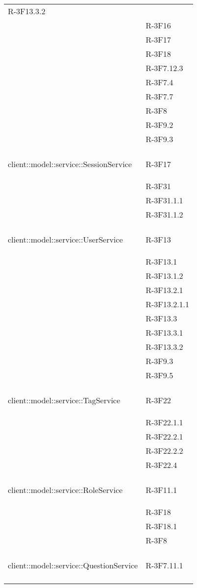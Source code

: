\begin{longtable}{l p{3cm}}
R-3F13.3.2 \tabularnewline &

R-3F16 \tabularnewline &

R-3F17 \tabularnewline &

R-3F18 \tabularnewline &

R-3F7.12.3 \tabularnewline &

R-3F7.4 \tabularnewline &

R-3F7.7 \tabularnewline &

R-3F8 \tabularnewline &

R-3F9.2 \tabularnewline &

R-3F9.3 \tabularnewline &\tabularnewline
\midrule
\hypertarget{client::model::service::SessionService}{client::model::service::SessionService} & R-3F17 \tabularnewline &

R-3F31 \tabularnewline &

R-3F31.1.1 \tabularnewline &

R-3F31.1.2 \tabularnewline &\tabularnewline
\midrule
\hypertarget{client::model::service::UserService}{client::model::service::UserService} & R-3F13 \tabularnewline &

R-3F13.1 \tabularnewline &

R-3F13.1.2 \tabularnewline &

R-3F13.2.1 \tabularnewline &

R-3F13.2.1.1 \tabularnewline &

R-3F13.3 \tabularnewline &

R-3F13.3.1 \tabularnewline &

R-3F13.3.2 \tabularnewline &

R-3F9.3 \tabularnewline &

R-3F9.5 \tabularnewline &\tabularnewline
\midrule
\hypertarget{client::model::service::TagService}{client::model::service::TagService} & R-3F22 \tabularnewline &

R-3F22.1.1 \tabularnewline &

R-3F22.2.1 \tabularnewline &

R-3F22.2.2 \tabularnewline &

R-3F22.4 \tabularnewline &\tabularnewline
\midrule
\hypertarget{client::model::service::RoleService}{client::model::service::RoleService} & R-3F11.1 \tabularnewline &

R-3F18 \tabularnewline &

R-3F18.1 \tabularnewline &

R-3F8 \tabularnewline &\tabularnewline
\midrule
\hypertarget{client::model::service::QuestionService}{client::model::service::QuestionService} & R-3F7.11.1 \tabularnewline &


\end{longtable}
